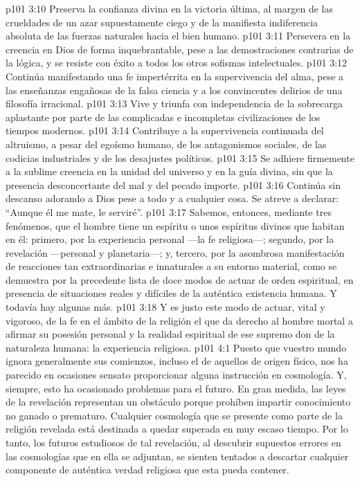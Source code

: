 \vs p101 3:10 Preserva la confianza divina en la victoria última, al margen de las crueldades de un azar supuestamente ciego y de la manifiesta indiferencia absoluta de las fuerzas naturales hacia el bien humano.
\vs p101 3:11 Persevera en la creencia en Dios de forma inquebrantable, pese a las demostraciones contrarias de la lógica, y se resiste con éxito a todos los otros sofismas intelectuales.
\vs p101 3:12 Continúa manifestando una fe impertérrita en la supervivencia del alma, pese a las enseñanzas engañosas de la falsa ciencia y a los convincentes delirios de una filosofía irracional.
\vs p101 3:13 Vive y triunfa con independencia de la sobrecarga aplastante por parte de las complicadas e incompletas civilizaciones de los tiempos modernos.
\vs p101 3:14 Contribuye a la supervivencia continuada del altruismo, a pesar del egoísmo humano, de los antagonismos sociales, de las codicias industriales y de los desajustes políticos.
\vs p101 3:15 Se adhiere firmemente a la sublime creencia en la unidad del universo y en la guía divina, sin que la presencia desconcertante del mal y del pecado importe.
\vs p101 3:16 Continúa sin descanso adorando a Dios pese a todo y a cualquier cosa. Se atreve a declarar: “Aunque él me mate, le serviré”.
\vs p101 3:17 \pc Sabemos, entonces, mediante tres fenómenos, que el hombre tiene un espíritu o unos espíritus divinos que habitan en él: primero, por la experiencia personal ---la fe religiosa---; segundo, por la revelación ---personal y planetaria---; y, tercero, por la asombrosa manifestación de reacciones tan extraordinarias e innaturales a su entorno material, como se demuestra por la precedente lista de doce modos de actuar de orden espiritual, en presencia de situaciones reales y difíciles de la auténtica existencia humana. Y todavía hay algunas más.
\vs p101 3:18 Y es justo este modo de actuar, vital y vigoroso, de la fe en el ámbito de la religión el que da derecho al hombre mortal a afirmar su posesión personal y la realidad espiritual de ese supremo don de la naturaleza humana: la experiencia religiosa.
\vs p101 4:1 Puesto que vuestro mundo ignora generalmente sus comienzos, incluso el de aquellos de origen físico, nos ha parecido en ocasiones sensato proporcionar alguna instrucción en cosmología. Y, siempre, esto ha ocasionado problemas para el futuro. En gran medida, las leyes de la revelación representan un obstáculo porque prohíben impartir conocimiento no ganado o prematuro. Cualquier cosmología que se presente como parte de la religión revelada está destinada a quedar superada en muy escaso tiempo. Por lo tanto, los futuros estudiosos de tal revelación, al descubrir supuestos errores en las cosmologías que en ella se adjuntan, se sienten tentados a descartar cualquier componente de auténtica verdad religiosa que esta pueda contener.
